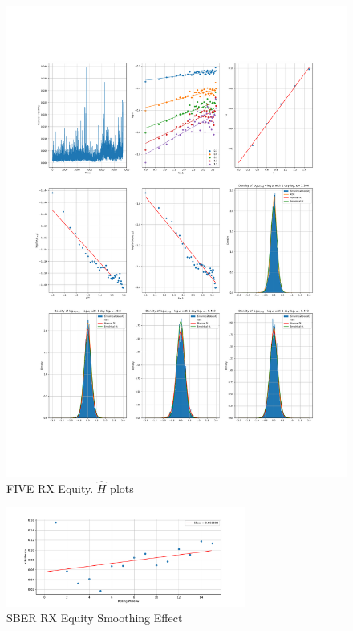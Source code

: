     \begin{figure}[h]
        \centering
        \includegraphics[width=\textwidth]{fig/FIVE RX Equity.pdf}
        \caption{FIVE RX Equity. $\hat{H}$ plots}
    \end{figure}



    \begin{figure}[h]
        \centering
        \includegraphics[width=0.7\textwidth]{fig/SBER RX Equity Smoothing Effect.pdf}
        \caption{SBER RX Equity Smoothing Effect}
    \end{figure}

